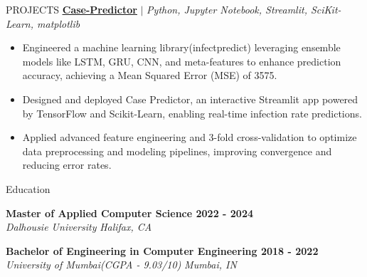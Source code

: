 \documentclass{resume} %
\begin{document}
\begin{rSection}{PROJECTS}
\href{https://github.com/RutvikJ77/Case-Predictor}
{\textbf{\underline{Case-Predictor}}} $|$\textit{ Python, Jupyter Notebook, Streamlit, SciKit-Learn, matplotlib}
\begin{itemize}
  \item Engineered a machine learning library(infectpredict) leveraging ensemble models like LSTM, GRU, CNN, and meta-features to enhance prediction accuracy, achieving a Mean Squared Error (MSE) of 3575.
  \item {Designed and deployed Case Predictor, an interactive Streamlit app powered by TensorFlow and Scikit-Learn, enabling real-time infection rate predictions.}
  \item {Applied advanced feature engineering and 3-fold cross-validation to optimize data preprocessing and modeling pipelines, improving convergence and reducing error rates.}
\end{itemize}


\end{rSection} 


\begin{rSection}{Education}

{\bf Master of Applied Computer Science \hfill {2022 - 2024}}\\
\textit{Dalhousie University} \hfill{\textit{Halifax, CA}}

{\bf Bachelor of Engineering in Computer Engineering \hfill {2018 - 2022}}\\
\textit{University of Mumbai(CGPA - 9.03/10)} \hfill{\textit{Mumbai, IN}}


\end{rSection}
\end{document}
